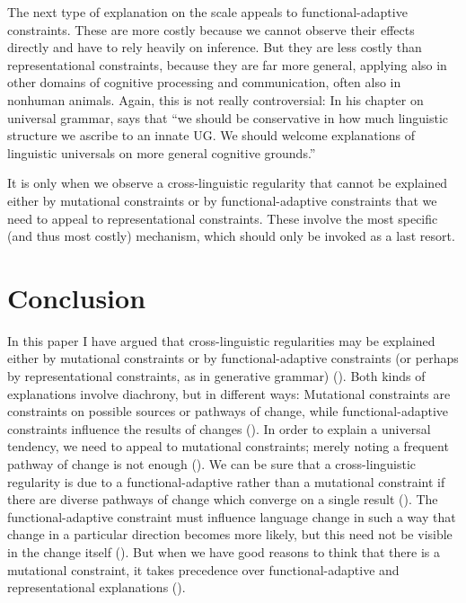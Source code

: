 \documentclass[output=paper]{langsci/langscibook}
\begin{document}
The next type of explanation on the scale appeals to functional-adaptive constraints. These are more costly because we cannot observe their effects directly and have to rely heavily on inference. But they are less costly than representational constraints, because they are far more general, applying also in other domains of cognitive processing and communication, often also in nonhuman animals. Again, this is not really controversial: In his chapter on universal grammar, \citet[79]{Jackendoff2002} says that “we should be conservative in how much linguistic structure we ascribe to an innate UG. We should welcome explanations of linguistic universals on more general cognitive grounds.”

It is only when we observe a cross-linguistic regularity that cannot be explained either by mutational constraints or by functional-adaptive constraints that we need to appeal to representational constraints. These involve the most specific (and thus most costly) mechanism, which should only be invoked as a last resort.

\section{Conclusion}

In this paper I have argued that cross-linguistic regularities may be explained either by mutational constraints or by functional-adaptive constraints (or perhaps by representational constraints, as in generative grammar) (). Both kinds of explanations involve diachrony, but in different ways: Mutational constraints are constraints on possible sources or pathways of change, while functional-adaptive constraints influence the results of changes (). In order to explain a universal tendency, we need to appeal to mutational constraints; merely noting a frequent pathway of change is not enough (). We can be sure that a cross-linguistic regularity is due to a functional-adaptive rather than a mutational constraint if there are diverse pathways of change which converge on a single result (). The functional-adaptive constraint must influence language change in such a way that change in a particular direction becomes more likely, but this need not be visible in the change itself (). But when we have good reasons to think that there is a mutational constraint, it takes precedence over functional-adaptive and representational explanations ().
\end{document}
